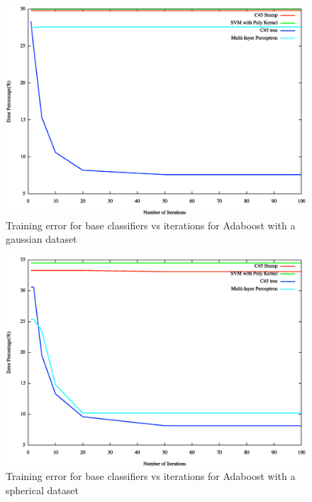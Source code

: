 \documentclass[letterpaper,11pt]{article}
\begin{document}
\begin{figure}[H]
  \centering
  \includegraphics[width=140mm]{modelVsAccuracy-train-gaussian.eps}
  \caption{Training error for base classifiers vs iterations for Adaboost with a gaussian dataset}
  \label{fig:modelVsAccuracytraingaussian}
\end{figure}

\begin{figure}[H]
  \centering
  \includegraphics[width=140mm]{modelVsAccuracy-train-spherical.eps}
  \caption{Training error for base classifiers vs iterations for Adaboost with a spherical dataset}
  \label{fig:modelVsAccuracytrainspherical}
\end{figure}
\end{document}
